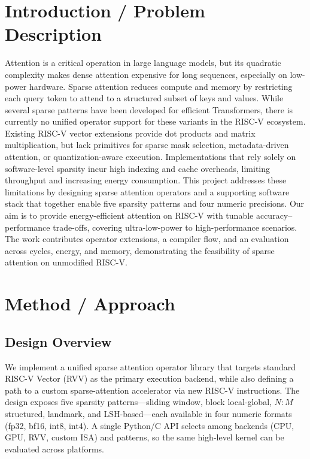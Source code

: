 \documentclass[10pt,conference]{IEEEtran}
\begin{document}
\section{Introduction / Problem Description}
Attention is a critical operation in large language models, but its quadratic complexity makes dense attention expensive for long sequences, especially on low-power hardware. Sparse attention reduces compute and memory by restricting each query token to attend to a structured subset of keys and values. While several sparse patterns have been developed for efficient Transformers, there is currently no unified operator support for these variants in the RISC-V ecosystem.
Existing RISC-V vector extensions provide dot products and matrix multiplication, but lack primitives for sparse mask selection, metadata-driven attention, or quantization-aware execution. Implementations that rely solely on software-level sparsity incur high indexing and cache overheads, limiting throughput and increasing energy consumption.
This project addresses these limitations by designing sparse attention operators and a supporting software stack that together enable five sparsity patterns and four numeric precisions. Our aim is to provide energy-efficient attention on RISC-V with tunable accuracy–performance trade-offs, covering ultra-low-power to high-performance scenarios. The work contributes operator extensions, a compiler flow, and an evaluation across cycles, energy, and memory, demonstrating the feasibility of sparse attention on unmodified RISC-V.

\section{Method / Approach}

\subsection{Design Overview}
We implement a unified sparse attention operator library that targets standard RISC-V Vector (RVV) as the primary execution backend, while also defining a path to a custom sparse-attention accelerator via new RISC-V instructions. The design exposes five sparsity patterns---sliding window, block local-global, $N\!:\!M$ structured, landmark, and LSH-based---each available in four numeric formats (fp32, bf16, int8, int4). A single Python/C API selects among backends (CPU, GPU, RVV, custom ISA) and patterns, so the same high-level kernel can be evaluated across platforms.
\end{document}
